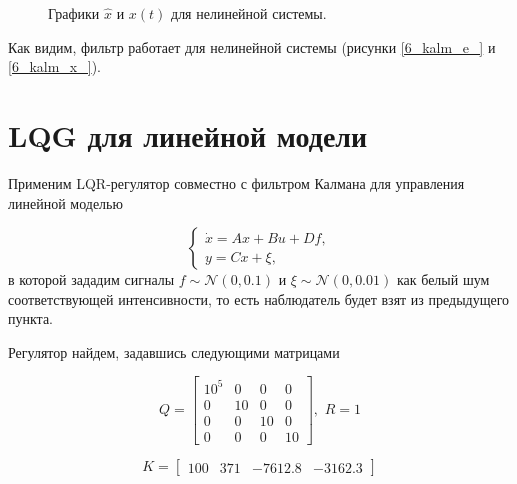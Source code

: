\begin{figure}[!h]
	\caption{Графики $\hat{x}$ и $x(t)$ для нелинейной системы.}
	\label{6_kalm_x_1}
\end{figure}

Как видим, фильтр работает для нелинейной системы (рисунки \ref{6_kalm_e_} и \ref{6_kalm_x_}).

\section{LQG для линейной модели}
Применим LQR-регулятор совместно с фильтром Калмана для управления линейной моделью

\begin{equation}
	\begin{cases}
\dot{x} = Ax + Bu + Df,\\
y = Cx + \xi,
	\end{cases}
\end{equation}
в которой зададим сигналы $f \sim \mathcal{N} (0, 0.1)$ и $\xi\sim \mathcal{N} (0, 0.01)$ как белый шум соответствующей интенсивности, то есть наблюдатель будет взят из предыдущего пункта. 

Регулятор найдем, задавшись следующими матрицами

\begin{equation}
	Q = \begin{bmatrix}
		10^5 & 0 & 0 & 0\\
		0 & 10 & 0 & 0\\
		0 & 0 & 10 & 0\\
		0 & 0 & 0 & 10
	\end{bmatrix}, \, \, R=1
\end{equation}

\begin{equation}
K= \begin{bmatrix}
	100&371&-7612.8&-3162.3
\end{bmatrix}
\end{equation}

